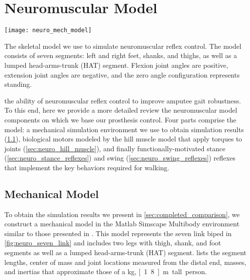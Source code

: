 \chapter{Neuromuscular Model}\label{sec:neuro_model}
\begin{marginfigure}
    \centering
    \texttt{[image: neuro\_mech\_model]}
    \caption{The skeletal model we use to simulate neuromuscular reflex control.
    The model consists of seven segments: left and right feet, shanks, and
    thighs, as well as a lumped head-arms-trunk (HAT) segment. Flexion joint
    angles are positive, extension joint angles are negative, and the zero
    angle configuration represents standing.}
    \label{fig:neuro_seven_link}
\end{marginfigure}

 the ability of
neuromuscular reflex control to improve amputee gait robustness. To this end,
here we provide a more detailed review the neuromuscular model components on
which we base our prosthesis control. Four parts comprise the model: a
mechanical simulation environment we use to obtain simulation results
(\cref{sec:neuro_mech_model}), biological motors modeled by the hill muscle
model that apply torques to joints (\cref{sec:neuro_hill_muscle}), and finally
functionally-motivated stance (\cref{sec:neuro_stance_reflexes}) and swing
(\cref{sec:neuro_swing_reflexes}) reflexes that implement the key behaviors
required for walking.

\section{Mechanical Model}\label{sec:neuro_mech_model}

To obtain the simulation results we present in \cref{sec:completed_comparison},
we construct a mechanical model in the Matlab Simscape Multibody environment
similar to those presented in \citet{geyer2010muscle, song2013integration,
song2015neural}.  This model represents the seven link biped in
\cref{fig:neuro_seven_link} and includes two legs with thigh, shank, and foot
segments as well as a lumped head-arms-trunk (HAT) segment.
 lists the segment lengths, center of mass and joint
locations measured from the distal end, masses, and inertias that approximate
those of a \unit[80]{kg}, \unit[1.8]{m} tall person.

